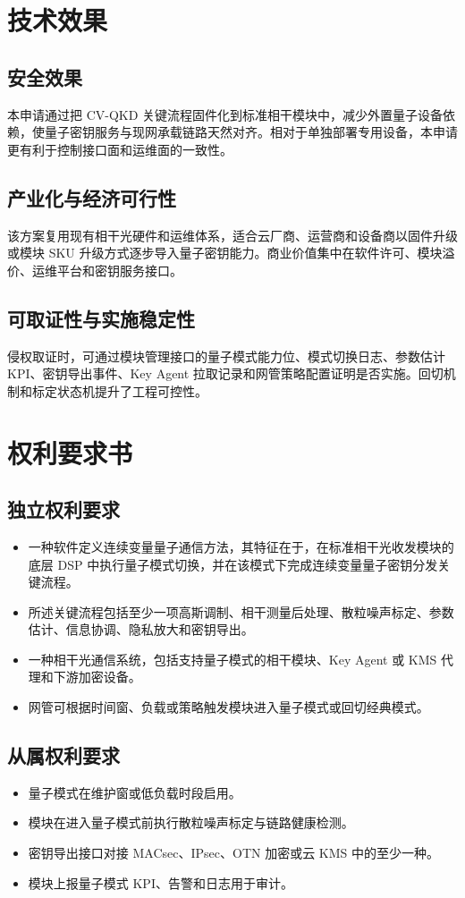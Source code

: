 ﻿\documentclass[12pt,a4paper]{article}
\begin{document}
\section{技术效果}
\subsection{安全效果}
本申请通过把 CV-QKD 关键流程固件化到标准相干模块中，减少外置量子设备依赖，使量子密钥服务与现网承载链路天然对齐。相对于单独部署专用设备，本申请更有利于控制接口面和运维面的一致性。

\subsection{产业化与经济可行性}
该方案复用现有相干光硬件和运维体系，适合云厂商、运营商和设备商以固件升级或模块 SKU 升级方式逐步导入量子密钥能力。商业价值集中在软件许可、模块溢价、运维平台和密钥服务接口。

\subsection{可取证性与实施稳定性}
侵权取证时，可通过模块管理接口的量子模式能力位、模式切换日志、参数估计 KPI、密钥导出事件、Key Agent 拉取记录和网管策略配置证明是否实施。回切机制和标定状态机提升了工程可控性。

\section{权利要求书}
\subsection{独立权利要求}
\begin{itemize}
\item 一种软件定义连续变量量子通信方法，其特征在于，在标准相干光收发模块的底层 DSP 中执行量子模式切换，并在该模式下完成连续变量量子密钥分发关键流程。
\item 所述关键流程包括至少一项高斯调制、相干测量后处理、散粒噪声标定、参数估计、信息协调、隐私放大和密钥导出。
\item 一种相干光通信系统，包括支持量子模式的相干模块、Key Agent 或 KMS 代理和下游加密设备。
\item 网管可根据时间窗、负载或策略触发模块进入量子模式或回切经典模式。
\end{itemize}

\subsection{从属权利要求}
\begin{itemize}
\item 量子模式在维护窗或低负载时段启用。
\item 模块在进入量子模式前执行散粒噪声标定与链路健康检测。
\item 密钥导出接口对接 MACsec、IPsec、OTN 加密或云 KMS 中的至少一种。
\item 模块上报量子模式 KPI、告警和日志用于审计。
\end{itemize}
\end{document}
